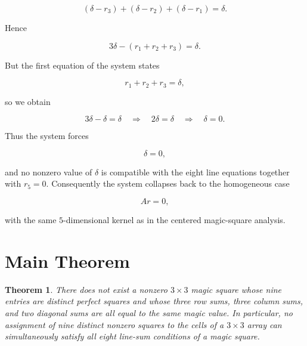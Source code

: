 \documentclass[12pt]{article}
\newtheorem{theorem}{Theorem}
\begin{document}
\[
(\delta-r_{3})+(\delta-r_{2})+(\delta-r_{1})=\delta.
\]



Hence


\[
3\delta-(r_{1}+r_{2}+r_{3})=\delta.
\]



But the first equation of the system states


\[
r_{1}+r_{2}+r_{3}=\delta,
\]


so we obtain


\[
3\delta-\delta=\delta \quad\Longrightarrow\quad 2\delta=\delta \quad\Longrightarrow\quad \delta=0.
\]



Thus the system forces


\[
\boxed{\delta=0},
\]


and no nonzero value of \(\delta\) is compatible with the eight line equations together with \(r_{5}=0\). Consequently the system collapses back to the homogeneous case


\[
A r = 0,
\]


with the same \(5\)-dimensional kernel as in the centered magic-square analysis.





\vspace{5em} %

\section*{Main Theorem}

\begin{theorem}
There does not exist a nonzero $3\times 3$ magic square whose nine entries are
distinct perfect squares and whose three row sums, three column sums, and two
diagonal sums are all equal to the same magic value.  In particular, no
assignment of nine distinct nonzero squares to the cells of a $3\times 3$
array can simultaneously satisfy all eight line-sum conditions of a magic
square.
\end{theorem}
\end{document}
